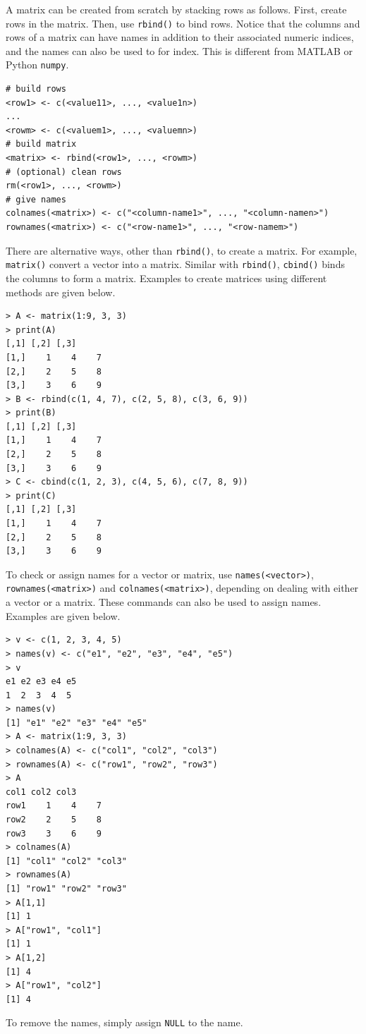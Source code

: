 A matrix can be created from scratch by stacking rows as follows. First, create rows in the matrix. Then, use \verb|rbind()| to bind rows. Notice that the columns and rows of a matrix can have names in addition to their associated numeric indices, and the names can also be used to for index. This is different from MATLAB or Python \verb|numpy|.
\begin{lstlisting}
# build rows
<row1> <- c(<value11>, ..., <value1n>)
...
<rowm> <- c(<valuem1>, ..., <valuemn>)
# build matrix
<matrix> <- rbind(<row1>, ..., <rowm>)
# (optional) clean rows
rm(<row1>, ..., <rowm>)
# give names
colnames(<matrix>) <- c("<column-name1>", ..., "<column-namen>")
rownames(<matrix>) <- c("<row-name1>", ..., "<row-namem>")
\end{lstlisting}

There are alternative ways, other than \verb|rbind()|, to create a matrix. For example, \verb|matrix()| convert a vector into a matrix. Similar with \verb|rbind()|, \verb|cbind()| binds the columns to form a matrix. Examples to create matrices using different methods are given below.
\begin{lstlisting}
> A <- matrix(1:9, 3, 3)
> print(A)
[,1] [,2] [,3]
[1,]    1    4    7
[2,]    2    5    8
[3,]    3    6    9
> B <- rbind(c(1, 4, 7), c(2, 5, 8), c(3, 6, 9))
> print(B)
[,1] [,2] [,3]
[1,]    1    4    7
[2,]    2    5    8
[3,]    3    6    9
> C <- cbind(c(1, 2, 3), c(4, 5, 6), c(7, 8, 9))
> print(C)
[,1] [,2] [,3]
[1,]    1    4    7
[2,]    2    5    8
[3,]    3    6    9
\end{lstlisting}

To check or assign names for a vector or matrix, use \verb|names(<vector>)|, \verb|rownames(<matrix>)| and \verb|colnames(<matrix>)|, depending on dealing with either a vector or a matrix. These commands can also be used to assign names. Examples are given below.
\begin{lstlisting}
> v <- c(1, 2, 3, 4, 5)
> names(v) <- c("e1", "e2", "e3", "e4", "e5")
> v
e1 e2 e3 e4 e5
1  2  3  4  5
> names(v)
[1] "e1" "e2" "e3" "e4" "e5"
> A <- matrix(1:9, 3, 3)
> colnames(A) <- c("col1", "col2", "col3")
> rownames(A) <- c("row1", "row2", "row3")
> A
col1 col2 col3
row1    1    4    7
row2    2    5    8
row3    3    6    9
> colnames(A)
[1] "col1" "col2" "col3"
> rownames(A)
[1] "row1" "row2" "row3"
> A[1,1]
[1] 1
> A["row1", "col1"]
[1] 1
> A[1,2]
[1] 4
> A["row1", "col2"]
[1] 4
\end{lstlisting}
To remove the names, simply assign \verb|NULL| to the name.

